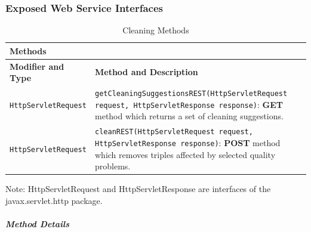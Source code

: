 \subsubsection{Exposed Web Service Interfaces}
\label{sec:service-API}


\begin{table}[h]
\captionsetup{justification=raggedright,singlelinecheck=false}
\caption{Cleaning Methods}
\label{tbl:valid_meth}
\begin{tabular}{|p{5cm}|p{10cm}|}
\hline
\multicolumn{2}{|l|}{\textbf{Methods}} \\ \hline

\textbf{Modifier and Type} & 
\textbf{Method and Description} \\ \hline

\texttt{HttpServletRequest} & 
\texttt{getCleaningSuggestionsREST(HttpServletRequest
request, HttpServletResponse response)}: \textbf{GET} method which returns a set of cleaning suggestions. \\ \hline

\texttt{HttpServletRequest} & 
\texttt{cleanREST(HttpServletRequest
request, HttpServletResponse response)}: \textbf{POST} method which removes triples affected by selected quality problems. \\ \hline

\hline
\end{tabular}
\end{table}
Note: HttpServletRequest and HttpServletResponse are interfaces of the javax.servlet.http package.

\subparagraph{Method Details}

